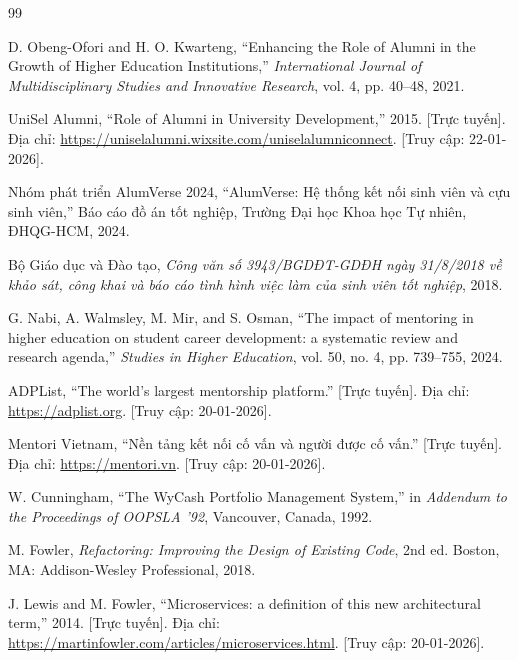 \documentclass[12pt,a4paper,oneside]{report}
\begin{document}
\begin{thebibliography}{99}

 D. Obeng-Ofori and H. O. Kwarteng, ``Enhancing the Role of Alumni in the Growth of Higher Education Institutions,'' \textit{International Journal of Multidisciplinary Studies and Innovative Research}, vol. 4, pp. 40--48, 2021.

 UniSel Alumni, ``Role of Alumni in University Development,'' 2015. [Trực tuyến]. Địa chỉ: \url{https://uniselalumni.wixsite.com/uniselalumniconnect}. [Truy cập: 22-01-2026].

 Nhóm phát triển AlumVerse 2024, ``AlumVerse: Hệ thống kết nối sinh viên và cựu sinh viên,'' Báo cáo đồ án tốt nghiệp, Trường Đại học Khoa học Tự nhiên, ĐHQG-HCM, 2024.

 Bộ Giáo dục và Đào tạo, \textit{Công văn số 3943/BGDĐT-GDĐH ngày 31/8/2018 về khảo sát, công khai và báo cáo tình hình việc làm của sinh viên tốt nghiệp}, 2018.

 G. Nabi, A. Walmsley, M. Mir, and S. Osman, ``The impact of mentoring in higher education on student career development: a systematic review and research agenda,'' \textit{Studies in Higher Education}, vol. 50, no. 4, pp. 739--755, 2024.

 ADPList, ``The world's largest mentorship platform.'' [Trực tuyến]. Địa chỉ: \url{https://adplist.org}. [Truy cập: 20-01-2026].

 Mentori Vietnam, ``Nền tảng kết nối cố vấn và người được cố vấn.'' [Trực tuyến]. Địa chỉ: \url{https://mentori.vn}. [Truy cập: 20-01-2026].

 W. Cunningham, ``The WyCash Portfolio Management System,'' in \textit{Addendum to the Proceedings of OOPSLA '92}, Vancouver, Canada, 1992.

 M. Fowler, \textit{Refactoring: Improving the Design of Existing Code}, 2nd ed. Boston, MA: Addison-Wesley Professional, 2018.

 J. Lewis and M. Fowler, ``Microservices: a definition of this new architectural term,'' 2014. [Trực tuyến]. Địa chỉ: \url{https://martinfowler.com/articles/microservices.html}. [Truy cập: 20-01-2026].


\end{thebibliography}
\end{document}

